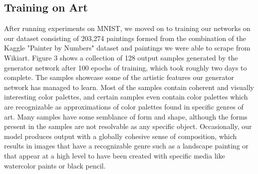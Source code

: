 \documentclass[10pt,twocolumn,letterpaper]{article}
\begin{document}
\subsection{Training on Art}
After running experiments on MNIST, we moved on to training our networks on our dataset consisting of 203,274 paintings formed from the combination of the Kaggle "Painter by Numbers" dataset and paintings we were able to scrape from Wikiart. Figure 3 shows a collection of 128 output samples generated by the generator network after 100 epochs of training, which took roughly two days to complete. The samples showcase some of the artistic features our generator network has managed to learn. Most of the samples contain coherent and visually interesting color palettes, and certain samples even contain color palettes which are recognizable as approximations of color palettes found in specific genres of art. Many samples have some semblance of form and shape, although the forms present in the samples are not resolvable as any specific object. Occasionally, our model produces output with a globally cohesive sense of composition, which results in images that have a recognizable genre such as a landscape painting or that appear at a high level to have been created with specific media like watercolor paints or black pencil.
\end{document}
